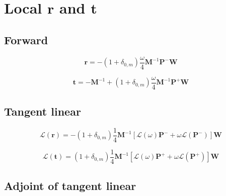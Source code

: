 %
\section{Local $\mathbf{r}$ and $\mathbf{t}$}
\label{sec:local_r_and_t}


\subsection{Forward}
\label{sec:local_r_and_t-forward}

\begin{equation}
\mathbf{r} = -(1 + \delta_{0,m}) \frac{\omega}{4}\mathbf{M}^{-1}\mathbf{P}^{-}\mathbf{W}
\label{eq:local_r_and_t-forward-r}
\end{equation}

\begin{equation}
\mathbf{t} = -\mathbf{M}^{-1} + (1 + \delta_{0,m}) \frac{\omega}{4}\mathbf{M}^{-1}\mathbf{P}^{+}\mathbf{W}
\label{eq:local_r_and_t-forward-t}
\end{equation}


%
\subsection{Tangent linear}
\label{sec:local_r_and_t-tangent_linear}

\begin{equation}
\mathcal{L}(\mathbf{r}) = -(1 + \delta_{0,m}) \frac{1}{4}\mathbf{M}^{-1}\left[\mathcal{L}(\omega)\mathbf{P}^{-} + \omega\mathcal{L}(\mathbf{P}^{-})\right]\mathbf{W}
\label{eq:local_r_and_t-tangent_linear-u}
\end{equation}

\begin{equation}
\mathcal{L}(\mathbf{t}) = (1 + \delta_{0,m}) \frac{1}{4}\mathbf{M}^{-1}\left[\mathcal{L}(\omega)\mathbf{P}^{+} + \omega\mathcal{L}(\mathbf{P}^{+})\right]\mathbf{W}
\label{eq:local_r_and_t-tangent_linear-w}
\end{equation}


%
\subsection{Adjoint of tangent linear}
\label{sec:local_r_and_t-adjoint_of_tangent_linear}

